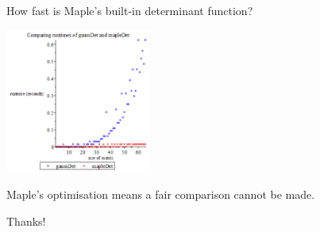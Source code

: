 \documentclass{beamer}
\begin{document}
\begin{frame}{How fast is Maple's built-in determinant function?}
    \begin{center}{}
        \includegraphics[height=180]{gauss-maple}
    \end{center}
    
    Maple's optimisation means a fair comparison cannot be made.
\end{frame}

\begin{frame}{}
    \begin{center}{}
        \Huge{Thanks!}
    \end{center}
\end{frame}
\end{document}

